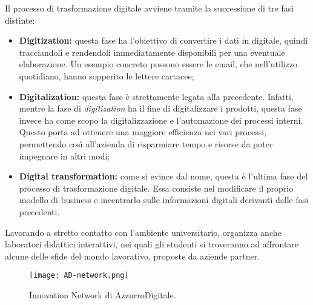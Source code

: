Il processo di trasformazione digitale avviene tramite la successione di tre fasi distinte: 
\begin{itemize}
\item \textbf{Digitization:} questa fase ha l'obiettivo di convertire i dati in digitale, quindi tracciandoli e rendendoli immediatamente disponibili per una eventuale elaborazione. Un esempio concreto possono essere le email, che nell'utilizzo quotidiano, hanno sopperito le lettere cartacee;
\item \textbf{Digitalization:} questa fase è strettamente legata alla precedente. Infatti, mentre la fase di \textit{digitization} ha il fine di digitalizzare i prodotti, questa fase invece ha come scopo la digitalizzazione e l'automazione dei processi interni. Questo porta ad ottenere una maggiore efficienza nei vari processi, permettendo così all'azienda di risparmiare tempo e risorse da poter impegnare in altri modi;
\item \textbf{Digital transformation:} come si evince dal nome, questa è l'ultima fase del processo di trasformazione digitale. Essa consiste nel modificare il proprio modello di business e incentrarlo sulle informazioni digitali derivanti dalle fasi precedenti. 
\end{itemize}
Lavorando a stretto contatto con l'ambiente universitario, \AD{} organizza anche laboratori didattici interattivi, nei quali gli studenti si troveranno ad affrontare alcune delle sfide del mondo lavorativo, proposte da aziende partner.

\begin{figure}[h]
\texttt{[image: AD-network.png]}
\centering
\caption{Innovation Network di AzzurroDigitale.} 
\label{fig:innovation-network}
\end{figure}

